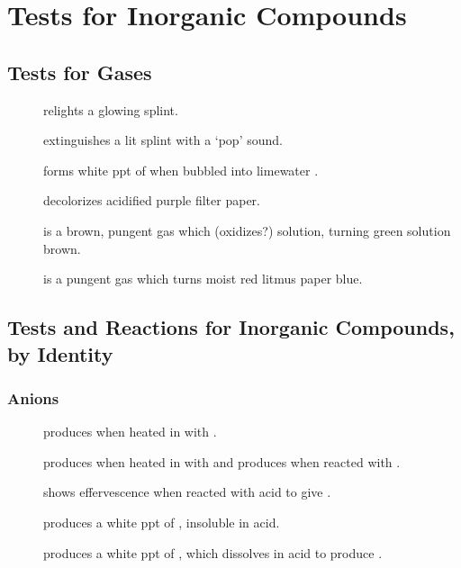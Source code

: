\documentclass[../main]{subfiles}
\begin{document}
\section{Tests for Inorganic Compounds}

	\subsection{Tests for Gases}

	\begin{description}
		\item[] relights a glowing splint.
		\item[] extinguishes a lit splint with a `pop' sound.
		\item[] forms white ppt of  when bubbled into limewater .
		\item[] decolorizes acidified purple  filter paper.
		\item[] is a brown, pungent gas which (oxidizes?)  solution, turning green solution brown.
		\item[] is a pungent gas which turns moist red litmus paper blue.
	\end{description}

	\subsection{Tests and Reactions for Inorganic Compounds, by Identity}

		\subsubsection{Anions}

		\begin{description}
			\item[] produces  when heated in  with .
			\item[] produces  when heated in  with  and produces  when reacted with .
			\item[] shows effervescence when reacted with acid to give .
			\item[] produces a white ppt of , insoluble in acid.
			\item[] produces a white ppt of , which dissolves in acid to produce .
		\end{description}
\end{document}
